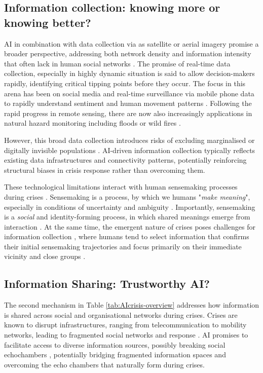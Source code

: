 \documentclass[pdflatex,sn-apa]{sn-jnl}%
\begin{document}
\subsection{Information collection: knowing more or knowing better?}
AI in combination with data collection via as satellite or aerial imagery promise a broader perspective, addressing both network density and information intensity that often lack in human social networks \citep{pan2012crisis}. The promise of real-time data collection, especially in highly dynamic situation is said to allow decision-makers rapidly, identifying critical tipping points before they occur. The focus in this arena has been on social media and real-time surveillance via mobile phone data to rapidly understand sentiment and human movement patterns \citep{middleton2013real, qadir2016crisis, mai2025evaluating}. Following the rapid progress in remote sensing, there are now also increasingly applications in natural hazard monitoring including floods \citep{zhou2024threshold} or wild fires \citep{roy2024multi}.

However, this broad data collection introduces risks of excluding marginalised or digitally invisible populations \citep{coleman2024weaving}. AI-driven information collection typically reflects existing data infrastructures and connectivity patterns, potentially reinforcing structural biases in crisis response rather than overcoming them.

These technological limitations interact with human sensemaking processes during crises \citep{klein2010rapid}. Sensemaking is a process, by which we humans "\textit{make meaning}", especially in conditions of uncertainty and ambiguity \citep{weick2005organizing}. Importantly, sensemaking is a \textit{social} and identity-forming process, in which shared meanings emerge from interaction \citep{maitlis2010sensemaking}. At the same time, the emergent nature of crises poses challenges for information collection \citep{turoff2004design}, where humans tend to  select information that confirms their initial sensemaking trajectories \citep{barbera2015tweeting} and focus primarily on their immediate vicinity and close groups \citep{comes2020coordination}.


\subsection{Information Sharing: Trustworthy AI?}
The second mechanism in Table \ref{tab:AIcrisis-overview} addresses how information is shared across social and organisational networks during crises. Crises are known to disrupt infrastructures, ranging from telecommunication to mobility networks, leading to fragmented social networks and response \citep{holguin2012unique}. AI promises to facilitate access to diverse information sources, possibly breaking social echochambers \citep{jeon2024hearhere}, potentially bridging fragmented information spaces and overcoming the echo chambers that naturally form during crises.
\end{document}
